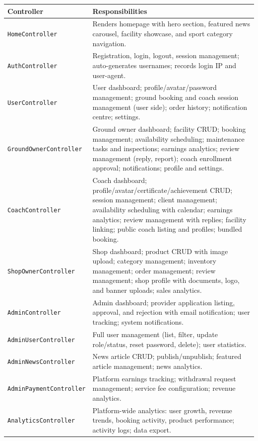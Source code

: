 \documentclass[12pt,a4paper]{report}
\begin{document}
\begin{center}
\begin{longtable}{p{5cm} p{9.5cm}}
\toprule
\textbf{Controller} & \textbf{Responsibilities}\\
\midrule
\endhead
\texttt{HomeController}       & Renders homepage with hero section, featured news carousel, facility showcase, and sport category navigation.\\
\texttt{AuthController}       & Registration, login, logout, session management; auto-generates usernames; records login IP and user-agent.\\
\texttt{UserController}       & User dashboard; profile/avatar/password management; ground booking and coach session management (user side); order history; notification centre; settings.\\
\texttt{GroundOwnerController} & Ground owner dashboard; facility CRUD; booking management; availability scheduling; maintenance tasks and inspections; earnings analytics; review management (reply, report); coach enrollment approval; notifications; profile and settings.\\
\texttt{CoachController}      & Coach dashboard; profile/avatar/certificate/achievement CRUD; session management; client management; availability scheduling with calendar; earnings analytics; review management with replies; facility linking; public coach listing and profiles; bundled booking.\\
\texttt{ShopOwnerController}  & Shop dashboard; product CRUD with image upload; category management; inventory management; order management; review management; shop profile with documents, logo, and banner uploads; sales analytics.\\
\texttt{AdminController}      & Admin dashboard; provider application listing, approval, and rejection with email notification; user tracking; system notifications.\\
\texttt{AdminUserController}  & Full user management (list, filter, update role/status, reset password, delete); user statistics.\\
\texttt{AdminNewsController}  & News article CRUD; publish/unpublish; featured article management; news analytics.\\
\texttt{AdminPaymentController} & Platform earnings tracking; withdrawal request management; service fee configuration; revenue analytics.\\
\texttt{AnalyticsController}  & Platform-wide analytics: user growth, revenue trends, booking activity, product performance; activity logs; data export.\\

\end{longtable}
\end{center}
\end{document}
